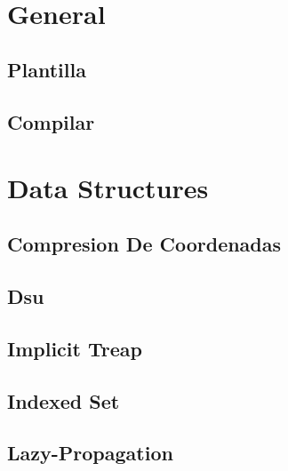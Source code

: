 \documentclass[9pt,portrait,twocolumn,a4paper,notitlepage]{article}
\newcommand\cppfile[2][]{%
\ifstrempty{#1}{}{}%
}
\newcommand\pythonfile[2][]{%
\ifstrempty{#1}{}{}%
}
\begin{document}
\def\title{Universidad Nacional de La Plata - NaN (Need a Name)}
 \\[0.5cm]


\section{General}

\subsection{Plantilla}
\cppfile{general/plantilla.cpp}

\subsection{Compilar}
\pythonfile{general/compilar.sh}


\section{Data Structures}

\subsection{Compresion De Coordenadas}
\cppfile{data_structures_clean/compresion_de_coordenadas.cpp}

\subsection{Dsu}
\cppfile{data_structures_clean/dsu.cpp}

\subsection{Implicit Treap}
\cppfile{data_structures_clean/implicit_treap.cpp}

\subsection{Indexed Set}
\cppfile{data_structures_clean/indexed_set.cpp}

\subsection{Lazy-Propagation}
\cppfile{data_structures_clean/lazy-propagation.cpp}
\end{document}
